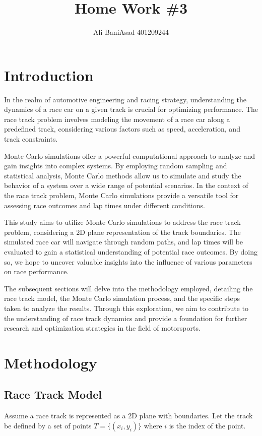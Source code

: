 \documentclass{article}
\title{Home Work \#3}
\author{Ali BaniAsad 401209244}
\begin{document}
	\maketitle
\section{Introduction}
In the realm of automotive engineering and racing strategy, understanding the dynamics of a race car on a given track is crucial for optimizing performance. The race track problem involves modeling the movement of a race car along a predefined track, considering various factors such as speed, acceleration, and track constraints.

Monte Carlo simulations offer a powerful computational approach to analyze and gain insights into complex systems. By employing random sampling and statistical analysis, Monte Carlo methods allow us to simulate and study the behavior of a system over a wide range of potential scenarios. In the context of the race track problem, Monte Carlo simulations provide a versatile tool for assessing race outcomes and lap times under different conditions.

This study aims to utilize Monte Carlo simulations to address the race track problem, considering a 2D plane representation of the track boundaries. The simulated race car will navigate through random paths, and lap times will be evaluated to gain a statistical understanding of potential race outcomes. By doing so, we hope to uncover valuable insights into the influence of various parameters on race performance.

The subsequent sections will delve into the methodology employed, detailing the race track model, the Monte Carlo simulation process, and the specific steps taken to analyze the results. Through this exploration, we aim to contribute to the understanding of race track dynamics and provide a foundation for further research and optimization strategies in the field of motorsports.


\section{Methodology}

\subsection{Race Track Model}
Assume a race track is represented as a 2D plane with boundaries. Let the track be defined by a set of points $T = \{(x_i, y_i)\}$ where $i$ is the index of the point.
\end{document}
